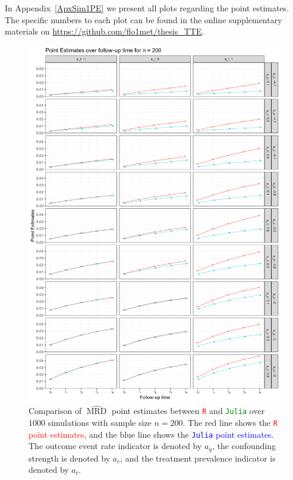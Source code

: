 \documentclass[pdflatex,sn-vancouver-ay]{sn-jnl}%
\theoremstyle{thmstyleone}%
\theoremstyle{thmstyletwo}%
\theoremstyle{thmstylethree}%
\newcommand{\Rlang}{\texttt{R}}
\newcommand{\julia}{\texttt{Julia}}
\begin{document}
\begin{appendices}
In Appendix~\ref{ApxSim1PE} we present all plots regarding the point estimates. The specific numbers to each plot can be found in the online supplementary materials on \url{https://github.com/flo1met/thesis_TTE}.

\newpage

\begin{figure}[H]
\centering
\includegraphics[height=0.95\textheight]{plots/plots_PE200.png}
\caption{Comparison of $\widehat{\operatorname{MRD}}$ point estimates between \textcolor{red}{\Rlang{}} and \textcolor{green}{\julia{}} over $1000$ simulations with sample size $n = 200$. The red line shows the \textcolor{red}{\Rlang{} point estimates}, and the blue line shows the \textcolor{blue}{\julia{} point estimates}. The outcome event rate indicator is denoted by $a_y$, the confounding strength is denoted by $a_c$, and the treatment prevalence indicator is denoted by $a_t$.}
\label{plt:PE200}
\end{figure}


\end{appendices}
\end{document}
